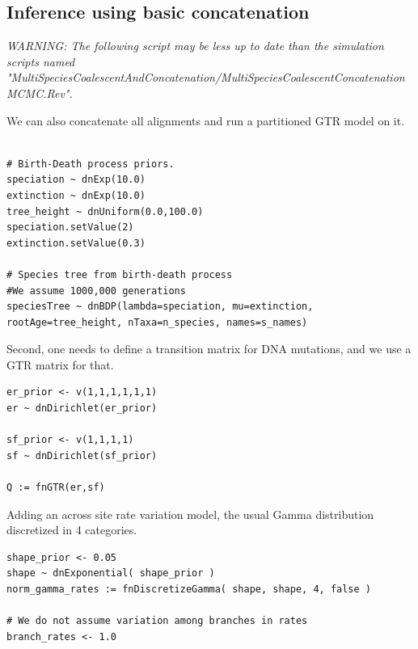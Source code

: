 \documentclass[11pt]{article}
\begin{document}
\subsection{Inference using basic concatenation }

{\begin{framed}
\begin{center}
\emph{WARNING: The following script may be less up to date than the simulation scripts named "MultiSpeciesCoalescentAndConcatenation/MultiSpeciesCoalescentConcatenationMCMC.Rev".}
\end{center}
\end{framed}}
\vspace{5mm}
We can also concatenate all alignments and run a partitioned GTR model on it.


 {\begin{framed}
 {\tt \begin{snugshade*}
\begin{lstlisting}

# Birth-Death process priors.
speciation ~ dnExp(10.0)
extinction ~ dnExp(10.0)
tree_height ~ dnUniform(0.0,100.0)
speciation.setValue(2)
extinction.setValue(0.3)

# Species tree from birth-death process
#We assume 1000,000 generations
speciesTree ~ dnBDP(lambda=speciation, mu=extinction, rootAge=tree_height, nTaxa=n_species, names=s_names)
\end{lstlisting}
\end{snugshade*}}
Second, one needs to define a transition matrix for DNA mutations, and we use a GTR matrix for that.

 {\tt \begin{snugshade*}
\begin{lstlisting}
er_prior <- v(1,1,1,1,1,1)
er ~ dnDirichlet(er_prior)

sf_prior <- v(1,1,1,1)
sf ~ dnDirichlet(sf_prior)

Q := fnGTR(er,sf) 
\end{lstlisting}
\end{snugshade*}}

Adding an across site rate variation model, the usual Gamma distribution discretized in 4 categories.
 {\tt \begin{snugshade*}
\begin{lstlisting}
shape_prior <- 0.05 
shape ~ dnExponential( shape_prior )
norm_gamma_rates := fnDiscretizeGamma( shape, shape, 4, false )

# We do not assume variation among branches in rates
branch_rates <- 1.0


\end{lstlisting}
\end{snugshade*}}
\end{framed}}
\end{document}
